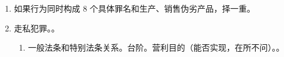 \begin{enumerate}
\begin{enumerate}
\begin{enumerate}
                  \item {}。
                  \item {}。
                \end{enumerate}
          \item 生产、销售、提供劣药。实害犯，吃死人。
          \item \sjt 提供。
                \begin{enumerate}
                  \item 无偿 \hz 有偿，和销售有部分重叠。
                  \item 真正身份犯。药品使用单位及其人员。。
                \end{enumerate}
          \item 结合诈骗。。
          \item 妨害药品管理。新增。编造、虚假、违禁药、批文。
                \begin{enumerate}
                  \item 具体危险。编造生产/检验记录、虚假材料申请许可、违禁药、无批文生产/进口/销售。
                  \item {}。
                \end{enumerate}
          \item 非法提供麻醉药品、精神药品。
                \begin{enumerate}
                  \item 原料、辅料；药品经营许可证非法渠道采购、销售。如不能认定假药、劣药 \yjt 行政处罚。
                  \item 麻醉药。\yi 医疗目的贩卖 \yjt 非法经营。\er 牟利目的 \yjt 贩卖毒品。
                \end{enumerate}
          \item 药品监管渎职。故意、过失均可。
        \end{enumerate}
  \item \sjt 如果行为同时构成 8 个具体罪名和生产、销售伪劣产品，择一重。
  \item 走私犯罪。。
        \begin{enumerate}
          \item \xjt 一般法条和特别法条关系。台阶。营利目的（能否实现，在所不问）。。

\end{enumerate}
\end{enumerate}
